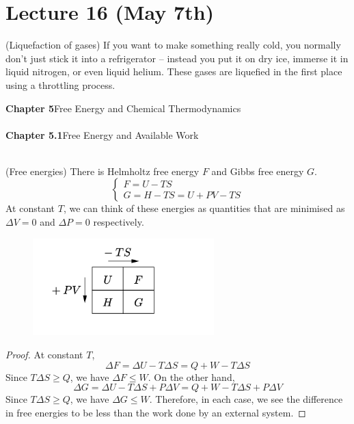 \section{Lecture 16 (May 7th)}
\begin{rmk}
(Liquefaction of gases) If you want to make something really cold, you normally don't just stick it into a refrigerator – instead you put it on dry ice, immerse it in liquid nitrogen, or even liquid helium. These gases are liquefied in the first place using a throttling process.
\end{rmk}
\vspace{2ex}
{\bf Chapter 5}\hspace{2ex}Free Energy and Chemical Thermodynamics
\\\\
{\bf Chapter 5.1}\hspace{2ex}Free Energy and Available Work
\\\\
\begin{defi}
(Free energies) There is Helmholtz free energy $F$ and Gibbs free energy $G$.
\[\begin{cases}
F=U-TS\\
G=H-TS=U+PV-TS
\end{cases}\]
At constant $T$, we can think of these energies as quantities that are minimised as $\Delta V=0$ and $\Delta P=0$ respectively.
\begin{figure}[h!]
\centering
\includegraphics[width=70mm]{FIG1.png}    
\end{figure}
\end{defi}
\vspace{2ex}
\begin{proof}
At constant $T$,
\[\Delta F=\Delta U-T\Delta S=Q+W-T\Delta S\]
Since $T\Delta S\geq Q$, we have $\Delta F\leq W$. On the other hand,
\[\Delta G=\Delta U-T\Delta S+P\Delta V=Q+W-T\Delta S+P\Delta V\]
Since $T\Delta S\geq Q$, we have $\Delta G\leq W$. Therefore, in each case, we see the difference in free energies to be less than the work done by an external system. 
\end{proof}
\vspace{2ex}

